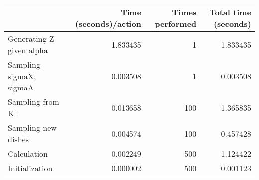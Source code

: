 \begin{tabular}{lrrr}
\toprule
{} &  Time (seconds)/action &  Times performed &  Total time (seconds) \\
\midrule
Generating Z given alpha &               1.833435 &                1 &              1.833435 \\
Sampling sigmaX, sigmaA  &               0.003508 &                1 &              0.003508 \\
Sampling from K+         &               0.013658 &              100 &              1.365835 \\
Sampling new dishes      &               0.004574 &              100 &              0.457428 \\
Calculation              &               0.002249 &              500 &              1.124422 \\
Initialization           &               0.000002 &              500 &              0.001123 \\
\bottomrule
\end{tabular}
